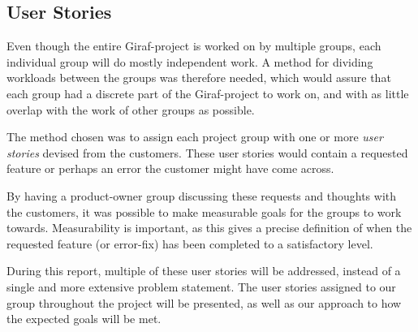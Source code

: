 \subsection{User Stories} \label{ssec:UserStories}
Even though the entire Giraf-project is worked on by multiple groups, each individual group will do mostly independent work.
A method for dividing workloads between the groups was therefore needed, which would assure that each group had a discrete part of the Giraf-project to work on, and with as little overlap with the work of other groups as possible.

The method chosen was to assign each project group with one or more \textit{user stories} devised from the customers.
These user stories would contain a requested feature or perhaps an error the customer might have come across.

By having a product-owner group discussing these requests and thoughts with the customers, it was possible to make measurable goals for the groups to work towards.
Measurability is important, as this gives a precise definition of when the requested feature (or error-fix) has been completed to a satisfactory level.

During this report, multiple of these user stories will be addressed, instead of a single and more extensive problem statement.
The user stories assigned to our group throughout the project will be presented, as well as our approach to how the expected goals will be met.
